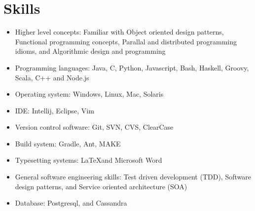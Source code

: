 \section{Skills}
\begin{itemize}
\item Higher level concepts: Familiar with Object oriented design patterns, Functional programming concepts, Parallal and distributed programming idioms, and Algorithmic design and programming

\item Programming languages: Java, C, Python, Javascript, Bash, Haskell, Groovy, Scala, C++ and Node.js


\item Operating system: Windows, Linux, Mac, Solaris

\item IDE: Intellij, Eclipse, Vim

\item Version control software: Git, SVN, CVS, ClearCase

\item Build system: Gradle, Ant, MAKE



\item Typesetting systems: \LaTeX and Microsoft Word

\item General software engineering skills: Test driven development (TDD), Software design patterns, and Service oriented architecture (SOA)

\item Database: Postgresql, and Cassandra

\end{itemize}
